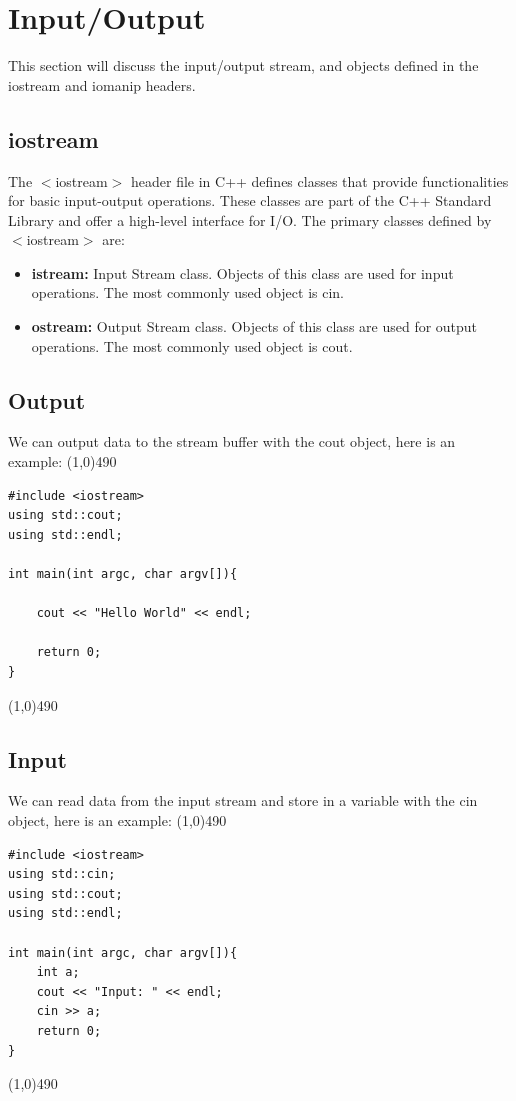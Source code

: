 \documentclass{report}
\begin{document}
    \section{\LARGE Input/Output}
    \bigbreak \noindent 
    This section will discuss the input/output stream, and objects defined in the iostream and iomanip headers.
    \bigbreak \noindent 
    \subsection{iostream}
    \bigbreak \noindent 
    The $<$iostream$>$ header file in C++ defines classes that provide functionalities for basic input-output operations. These classes are part of the C++ Standard Library and offer a high-level interface for I/O. The primary classes defined by $<$iostream$>$ are:
    \begin{itemize}
        \item \textbf{istream:} Input Stream class. Objects of this class are used for input operations. The most commonly used object is cin.
        \item \textbf{ostream:} Output Stream class. Objects of this class are used for output operations. The most commonly used object is cout.
    \end{itemize}
    \bigbreak \noindent 
    \subsection{Output}
    \bigbreak \noindent 
    We can output data to the stream buffer with the cout object, here is an example:
    \bigbreak \noindent 
    \line(1,0){490}
    \begin{verbatim}
#include <iostream>
using std::cout;
using std::endl;

int main(int argc, char argv[]){

    cout << "Hello World" << endl;

    return 0;
}
    \end{verbatim}
    \line(1,0){490}
    \bigbreak \noindent 
    \subsection{Input}
    \bigbreak \noindent 
    We can read data from the input stream and store in a variable with the cin object, here is an example:
    \bigbreak \noindent 
    \line(1,0){490}
    \begin{verbatim}
#include <iostream>
using std::cin;
using std::cout;
using std::endl;

int main(int argc, char argv[]){
    int a;
    cout << "Input: " << endl;
    cin >> a;
    return 0;
}

    \end{verbatim}
    \line(1,0){490}
\end{document}
